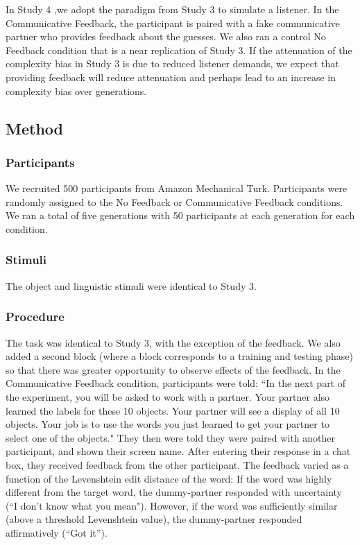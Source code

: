 In Study 4 ,we adopt the paradigm from Study 3 to simulate a listener. In the Communicative Feedback, the participant is paired with a fake communicative partner who provides feedback about the guesses. We also ran a control No Feedback condition that is a near replication of Study 3. If the attenuation of the complexity bias in Study 3 is due to reduced listener demands, we expect that providing feedback will reduce  attenuation and perhaps lead to an increase in complexity bias over generations. 

\subsection{Method}

\subsubsection{Participants}
We recruited 500 participants from Amazon Mechanical Turk. Participants were randomly assigned to the No Feedback or Communicative Feedback conditions. We ran a total of  five generations with 50 participants at each generation for each condition.

\subsubsection{Stimuli}
The object and linguistic stimuli were identical to Study 3.

\subsubsection{Procedure}
The task was identical to Study 3, with the exception of the feedback. We also added a second block (where a block corresponds to a training and testing phase) so that there was greater opportunity to observe effects of the feedback. In the Communicative Feedback condition, participants were told: ``In the next part of the experiment, you will be asked to work with a partner. Your partner also learned the labels for these 10 objects. Your partner will see a display of all 10 objects. Your job is to use the words you just learned to get your partner to select one of the objects." They then were  told they were paired with another participant, and shown their screen name. After entering their response in a chat box, they received feedback from the other participant. The feedback varied as a function of the Levenshtein edit distance of the word: If the word was highly different from the target word, the  dummy-partner responded with uncertainty (``I don't know what you mean"). However, if the word was sufficiently similar (above a threshold Levenshtein value), the dummy-partner responded affirmatively (``Got it'').

